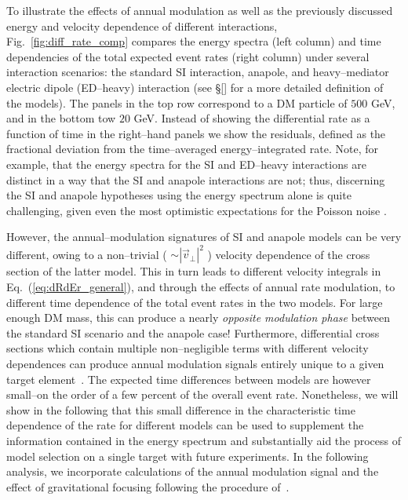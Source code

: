 \documentclass[11pt]{article}
\newcommand{\Eq}[1]{Eq.~(\ref{#1})} \newcommand{\Eqs}[2]{Eqs.~(\ref{#1}) and (\ref{#2})} \newcommand{\Eqm}[2]{Eqs.~(\ref{#1}) through (\ref{#2})}
\newcommand{\Fig}[1]{Fig.~\ref{#1}} \newcommand{\Figs}[2]{Figs.~\ref{#1} and \ref{#2}}
\begin{document}
To illustrate the effects of annual modulation as well as the previously discussed energy and velocity dependence of different interactions, \Fig{fig:diff_rate_comp} compares the energy spectra (left column) and time dependencies of the total expected event rates (right column) under several interaction scenarios: the standard SI interaction, anapole, and heavy--mediator electric dipole (ED--heavy) interaction (see \S\ref{} for a more detailed definition of the models). The panels in the top row correspond to a DM particle of $500$ GeV, and in the bottom tow $20$ GeV.  Instead of showing the differential rate as a function of time in the right--hand panels we show the residuals, defined as the fractional deviation from the time--averaged energy--integrated rate. Note, for example, that the energy spectra for the SI and ED--heavy interactions are distinct in a way that the SI and anapole interactions are not; thus, discerning the SI and anapole hypotheses using the energy spectrum alone is quite challenging, given even the most optimistic expectations for the Poisson noise \cite{Gluscevic:2015sqa}. 

However, the annual--modulation signatures of SI and anapole models can be very different, owing to a non--trivial ( $\sim | \vec v_\perp|^2$ ) velocity dependence of the cross section of the latter model. This in turn leads to different velocity integrals in \Eq{eq:dRdEr_general}, and through the effects of annual rate modulation, to different time dependence of the total event rates in the two models. For large enough DM mass, this can produce a nearly {\it opposite modulation phase} between the standard SI scenario and the anapole case! Furthermore, differential cross sections which contain multiple non--negligible terms with different velocity dependences can produce annual modulation signals entirely unique to a given target element~\cite{DelNobile:2015tza,DelNobile:2015rmp}. The expected time differences between models are however small--on the order of a few percent of the overall event rate. Nonetheless, we will show in the following that this small difference in the characteristic time dependence of the rate for different models can be used to supplement the information contained in the energy spectrum and substantially aid the process of model selection on a single target with future experiments. In the following analysis, we incorporate calculations of the annual modulation signal and the effect of gravitational focusing following the procedure of~\cite{Lee:2013wza}. 
\end{document}
